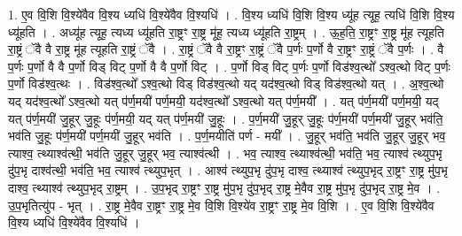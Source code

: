 \documentclass[17pt]{extarticle}
\begin{document}
1. ए॒व वि॒शि वि॒श्ये॑वैव वि॒श्य ध्यधि॑ वि॒श्ये॑वैव वि॒श्यधि॑ । . वि॒श्य ध्यधि॑ वि॒शि वि॒श्य ध्यू॑ह त्यूह॒ त्यधि॑ वि॒शि वि॒श्य ध्यू॑हति । . अध्यू॑ह त्यूह॒ त्यध्य ध्यू॑हति रा॒ष्ट्रꣳ रा॒ष्ट्र मू॑ह॒ त्यध्य ध्यू॑हति रा॒ष्ट्रम् । . ऊ॒ह॒ति॒ रा॒ष्ट्रꣳ रा॒ष्ट्र मू॑ह त्यूहति रा॒ष्ट्रं ॅवै वै रा॒ष्ट्र मू॑ह त्यूहति रा॒ष्ट्रं ॅवै । . रा॒ष्ट्रं ॅवै वै रा॒ष्ट्रꣳ रा॒ष्ट्रं ॅवै प॒र्णः प॒र्णो वै रा॒ष्ट्रꣳ रा॒ष्ट्रं ॅवै प॒र्णः । . वै प॒र्णः प॒र्णो वै वै प॒र्णो विड् विट् प॒र्णो वै वै प॒र्णो विट् । . प॒र्णो विड् विट् प॒र्णः प॒र्णो विड॑श्व॒त्थो᳚ ऽश्व॒त्थो विट् प॒र्णः प॒र्णो विड॑श्व॒त्थः । . विड॑श्व॒त्थो᳚ ऽश्व॒त्थो विड् विड॑श्व॒त्थो यद् यद॑श्व॒त्थो विड् विड॑श्व॒त्थो यत् । . अ॒श्व॒त्थो यद् यद॑श्व॒त्थो᳚ ऽश्व॒त्थो यत् प॑र्ण॒मयी॑ पर्ण॒मयी॒ यद॑श्व॒त्थो᳚ ऽश्व॒त्थो यत् प॑र्ण॒मयी᳚ । . यत् प॑र्ण॒मयी॑ पर्ण॒मयी॒ यद् यत् प॑र्ण॒मयी॑ जु॒हूर् जु॒हूः प॑र्ण॒मयी॒ यद् यत् प॑र्ण॒मयी॑ जु॒हूः । . प॒र्ण॒मयी॑ जु॒हूर् जु॒हूः प॑र्ण॒मयी॑ पर्ण॒मयी॑ जु॒हूर् भव॑ति॒ भव॑ति जु॒हूः प॑र्ण॒मयी॑ पर्ण॒मयी॑ जु॒हूर् भव॑ति । . प॒र्ण॒मयीति॑ पर्ण - मयी᳚ । . जु॒हूर् भव॑ति॒ भव॑ति जु॒हूर् जु॒हूर् भव॒ त्याश्व॒ त्थ्याश्व॑त्थी॒ भव॑ति जु॒हूर् जु॒हूर् भव॒ त्याश्व॑त्थी । . भव॒ त्याश्व॒ त्थ्याश्व॑त्थी॒ भव॑ति॒ भव॒ त्याश्व॑ त्थ्युप॒भृ दु॑प॒भृ दाश्व॑त्थी॒ भव॑ति॒ भव॒ त्याश्व॑ त्थ्युप॒भृत् । . आश्व॑ त्थ्युप॒भृ दु॑प॒भृ दाश्व॒ त्थ्याश्व॑ त्थ्युप॒भृद् रा॒ष्ट्रꣳ रा॒ष्ट्र मु॑प॒भृ दाश्व॒ त्थ्याश्व॑ त्थ्युप॒भृद् रा॒ष्ट्रम् । . उ॒प॒भृद् रा॒ष्ट्रꣳ रा॒ष्ट्र मु॑प॒भृ दु॑प॒भृद् रा॒ष्ट्र मे॒वैव रा॒ष्ट्र मु॑प॒भृ दु॑प॒भृद् रा॒ष्ट्र मे॒व । . उ॒प॒भृतित्यु॑प - भृत् । . रा॒ष्ट्र मे॒वैव रा॒ष्ट्रꣳ रा॒ष्ट्र मे॒व वि॒शि वि॒श्ये॑व रा॒ष्ट्रꣳ रा॒ष्ट्र मे॒व वि॒शि । . ए॒व वि॒शि वि॒श्ये॑वैव वि॒श्य ध्यधि॑ वि॒श्ये॑वैव वि॒श्यधि॑ । \newline
\end{document}
